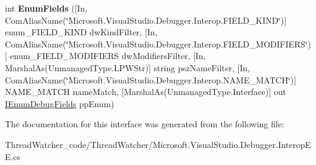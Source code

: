 \begin{DoxyCompactItemize}
\item 
\hypertarget{interface_microsoft_1_1_visual_studio_1_1_debugger_1_1_interop_e_e_1_1_i_debug_container_field_a0b6b215f95fad02aa361c89494d5ef23}{int {\bfseries Enum\+Fields} (\mbox{[}In, Com\+Alias\+Name(\char`\"{}Microsoft.\+Visual\+Studio.\+Debugger.\+Interop.\+F\+I\+E\+L\+D\+\_\+\+K\+I\+N\+D\char`\"{})\mbox{]} enum\+\_\+\+F\+I\+E\+L\+D\+\_\+\+K\+I\+N\+D dw\+Kind\+Filter, \mbox{[}In, Com\+Alias\+Name(\char`\"{}Microsoft.\+Visual\+Studio.\+Debugger.\+Interop.\+F\+I\+E\+L\+D\+\_\+\+M\+O\+D\+I\+F\+I\+E\+R\+S\char`\"{})\mbox{]} enum\+\_\+\+F\+I\+E\+L\+D\+\_\+\+M\+O\+D\+I\+F\+I\+E\+R\+S dw\+Modifiers\+Filter, \mbox{[}In, Marshal\+As(Unmanaged\+Type.\+L\+P\+W\+Str)\mbox{]} string psz\+Name\+Filter, \mbox{[}In, Com\+Alias\+Name(\char`\"{}Microsoft.\+Visual\+Studio.\+Debugger.\+Interop.\+N\+A\+M\+E\+\_\+\+M\+A\+T\+C\+H\char`\"{})\mbox{]} N\+A\+M\+E\+\_\+\+M\+A\+T\+C\+H name\+Match, \mbox{[}Marshal\+As(Unmanaged\+Type.\+Interface)\mbox{]} out \hyperlink{interface_microsoft_1_1_visual_studio_1_1_debugger_1_1_interop_e_e_1_1_i_enum_debug_fields}{I\+Enum\+Debug\+Fields} pp\+Enum)}\label{interface_microsoft_1_1_visual_studio_1_1_debugger_1_1_interop_e_e_1_1_i_debug_container_field_a0b6b215f95fad02aa361c89494d5ef23}

\end{DoxyCompactItemize}


The documentation for this interface was generated from the following file\+:\begin{DoxyCompactItemize}
\item 
Thread\+Watcher\+\_\+code/\+Thread\+Watcher/Microsoft.\+Visual\+Studio.\+Debugger.\+Interop\+E\+E.\+cs\end{DoxyCompactItemize}
